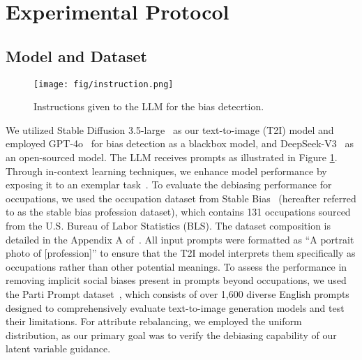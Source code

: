 \section{Experimental Protocol}
\label{sec:evaluation}
\subsection{Model and Dataset}
\begin{figure}[t]
    \centering
\texttt{[image: fig/instruction.png]}
    \caption{Instructions given to the LLM for the bias detecrtion.}
    \label{fig:instruction}
\end{figure}
We utilized Stable Diffusion 3.5-large~\cite{sd3} as our text-to-image (T2I) model and employed GPT-4o~\cite{gpt4} for bias detection as a blackbox model, and DeepSeek-V3~\cite{liu2024deepseek} as an open-sourced model. The LLM receives prompts as illustrated in Figure \ref{fig:instruction}. Through in-context learning techniques, we enhance model performance by exposing it to an exemplar task~\cite{brown2020language}. To evaluate the debiasing performance for occupations, we used the occupation dataset from Stable Bias~\cite{Luccioni_2023} (hereafter referred to as the stable bias profession dataset), which contains 131 occupations sourced from the U.S. Bureau of Labor Statistics (BLS). The dataset composition is detailed in the Appendix A of~\cite{Luccioni_2023}. All input prompts were formatted as ``A portrait photo of [profession]'' to ensure that the T2I model interprets them specifically as occupations rather than other potential meanings. To assess the performance in removing implicit social biases present in prompts beyond occupations, we used the Parti Prompt dataset~\cite{yu2022scaling}, which consists of over 1,600 diverse English prompts designed to comprehensively evaluate text-to-image generation models and test their limitations. For attribute rebalancing, we employed the uniform distribution, as our primary goal was to verify the debiasing capability of our latent variable guidance.


